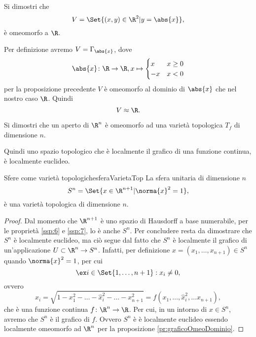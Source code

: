 \begin{ese}
	Si dimostri che
	\[
		V=\Set{(x,y)\in\R^2 | y=\abs{x}},
	\]
	è omeomorfo a \(\R\).
\end{ese}

\begin{sol}
	Per definizione avremo \(V=\Gamma_{\abs{x}}\), dove
	\[
		\abs{x}\colon\R\to\R, x\mapsto \begin{cases}
			x  & x\ge 0 \\
			-x & x<0
		\end{cases}
	\]
	per la proposizione precedente \(V\) è omeomorfo al dominio di \(\abs{x}\) che nel nostro caso \(\R\).
	Quindi
	\[
		V\approx \R.
	\]
\end{sol}

\begin{exe}
	Si dimostri che un aperto di \(\R^n\) è omeomorfo ad una varietà topologica \(T_f\) di dimensione \(n\).
\end{exe}

\begin{oss}
	Quindi uno spazio topologico che è localmente il grafico di una funzione continua, è localmente euclideo.
\end{oss}

\begin{prop}{Sfere come varietà topologiche}{sferaVarietaTop}
	La sfera unitaria di dimensione \(n\)
	\[
		S^n=\Set{x\in\R^{n+1} | \norma{x}^2=1},
	\]
	è una varietà topologica di dimensione \(n\).
\end{prop}

\begin{proof}
	Dal momento che \(\R^{n+1}\) è uno spazio di Hausdorff a base numerabile, per le proprietà \ref{ssp:6} e \ref{ssp:7}, lo è anche \(S^n\).
	Per concludere resta da dimostrare che \(S^n\) è localmente euclideo, ma ciò segue dal fatto che \(S^n\) è localmente il grafico di un'applicazione \(U\subset\R^n\to S^n\).
	Infatti, per definizione \(x=(x_1,\ldots,x_{n+1})\in S^n\) quando \(\norma{x}^2=1\), per cui
	\[
		\ex i\in\Set{1,\ldots,n+1}:x_i\neq 0,
	\]
	ovvero
	\[
		x_i=\sqrt{1-x_1^2- \ldots -\hat{x}_i^2- \ldots -x_{n+1}^2}=f(x_1,\ldots,\hat{x}_i^2,\ldots x_{n+1}),
	\]
	che è una funzione continua \(f\colon\R^n\to \R\).
	Per cui, in un intorno di \(x\in S^n\), avremo che \(S^n\) è il grafico di \(f\).
	Ovvero \(S^n\) è è localmente euclideo essendo localmente omeomorfo ad \(\R^n\) per la proposizione \ref{pr:graficoOmeoDominio}.
\end{proof}

